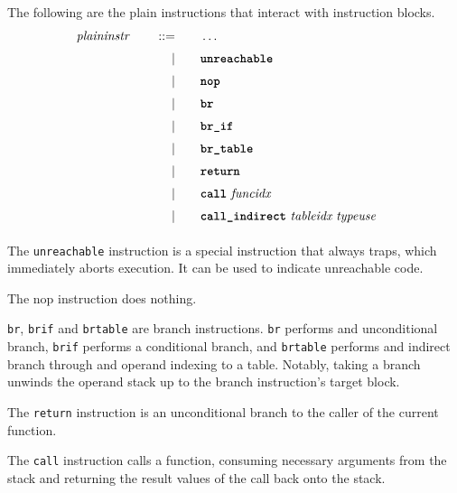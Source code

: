 The following are the plain instructions that interact with instruction blocks.
\begin{alignat*}{9}
    && \textit{plaininstr}\ &&\quad ::= &\quad && \dots \quad &&  \\[1mm]
    &&       &&\quad | &\quad && \textbf{\texttt{unreachable}}\ \quad && \\[1mm]
    &&       &&\quad | &\quad && \textbf{\texttt{nop}}\ \quad && \\[1mm]
    &&       &&\quad | &\quad && \textbf{\texttt{br}}\ \quad && \\[1mm]
    &&       &&\quad | &\quad && \textbf{\texttt{br\textunderscore if}}\ \quad && \\[1mm]
    &&       &&\quad | &\quad && \textbf{\texttt{br\textunderscore table}}\ \quad && \\[1mm]
    &&       &&\quad | &\quad && \textbf{\texttt{return}}\ \quad && \\[1mm]
    &&       &&\quad | &\quad && \textbf{\texttt{call}}\ \textit{funcidx}\ \quad && \\[1mm]
    &&       &&\quad | &\quad && \textbf{\texttt{call\textunderscore indirect}}\ \textit{tableidx}\ \textit{typeuse}\ \quad && \\[1mm]
\end{alignat*}

The \texttt{unreachable} instruction is a special instruction that always traps, which immediately aborts execution. It can be used to indicate unreachable code. \vspace{1em}

The nop instruction does nothing. \vspace{1em}

\texttt{br}, \texttt{br\textunderscore if} and \texttt{br\textunderscore table} are branch instructions.
\texttt{br} performs and unconditional branch, \texttt{br\textunderscore if} performs a conditional branch, and \texttt{br\textunderscore table}
performs and indirect branch through and operand indexing to a table. \vspace{1em} Notably, taking a branch unwinds the operand stack up to the branch instruction's target block. \vspace{1em}

The \texttt{return} instruction is an unconditional branch to the caller of the current function.\vspace{1em}

The \texttt{call} instruction calls a function, consuming necessary arguments from the stack and returning the result values of the call back onto the stack. \vspace{1em}

